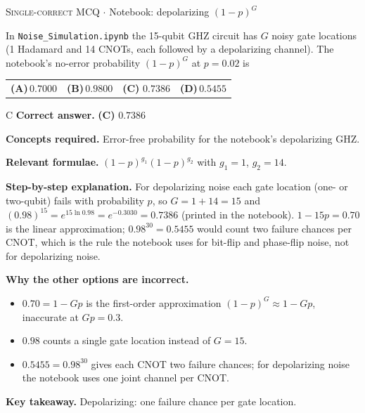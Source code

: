 \documentclass[11pt,a4paper]{article}
\newcommand{\optlabel}[1]{\textbf{(#1)}}
\newcommand{\correctlabel}[1]{\textcolor{okgreen}{\textbf{(#1)}\,\ding{51}}}
\newenvironment{qitem}[1]{\begin{list}{}{\setlength{\leftmargin}{3.3em}\setlength{\labelwidth}{3.1em}%
  \setlength{\labelsep}{0.2em}\setlength{\topsep}{3pt}\setlength{\parsep}{3pt}}\item[\textbf{Q.#1}\hfill]}{\end{list}}
\newcommand{\qsep}{\par\vspace{2pt}{\color{black!15}\hrule}\vspace{4pt}}
\newcommand{\qmeta}[2]{{\footnotesize\color{black!60}\textsc{#1} \;$\cdot$\; #2}\par}
\begin{document}
\begin{qitem}{46}
\qmeta{Single-correct MCQ}{Notebook: depolarizing $(1-p)^G$}
In \texttt{Noise\_Simulation.ipynb} the 15-qubit GHZ circuit has $G$ noisy gate locations (1 Hadamard and 14 CNOTs, each followed by a depolarizing channel).
The notebook's no-error probability $(1 - p)^G$ at $p = 0.02$ is
\par\smallskip\noindent\begin{tabularx}{\linewidth}{@{}*{4}{L}@{}}
\optlabel{A}\,$0.7000$ & \optlabel{B}\,$0.9800$ & \correctlabel{C}\,$0.7386$ & \optlabel{D}\,$0.5455$
\end{tabularx}
\end{qitem}
\begin{solbox}{C}
\textbf{\color{brand}Correct answer.} \textcolor{okgreen}{\textbf{(C)}} $0.7386$

\textbf{\color{brand}Concepts required.} Error-free probability for the notebook's depolarizing GHZ.

\textbf{\color{brand}Relevant formulae.} $(1-p)^{g_1}(1-p)^{g_2}$ with $g_1 = 1$, $g_2 = 14$.

\textbf{\color{brand}Step-by-step explanation.} For depolarizing noise each gate location (one- or two-qubit) fails with probability $p$, so $G = 1 + 14 = 15$ and
$(0.98)^{15} = e^{15\ln0.98} = e^{-0.3030} = 0.7386$ (printed in the notebook). $1 - 15p = 0.70$ is the linear approximation; $0.98^{30} = 0.5455$
would count two failure chances per CNOT, which is the rule the notebook uses for bit-flip and phase-flip noise, not for depolarizing noise.

\textbf{\color{brand}Why the other options are incorrect.}
\begin{itemize}[leftmargin=2.4em, itemsep=1pt, topsep=2pt]
\item[\textbf{(A)}] $0.70 = 1 - Gp$ is the first-order approximation $(1-p)^G \approx 1 - Gp$, inaccurate at $Gp = 0.3$.
\item[\textbf{(B)}] $0.98$ counts a single gate location instead of $G = 15$.
\item[\textbf{(D)}] $0.5455 = 0.98^{30}$ gives each CNOT two failure chances; for depolarizing noise the notebook uses one joint channel per CNOT.
\end{itemize}
\textbf{\color{brand}Key takeaway.} Depolarizing: one failure chance per gate location.
\end{solbox}
\qsep
\end{document}
